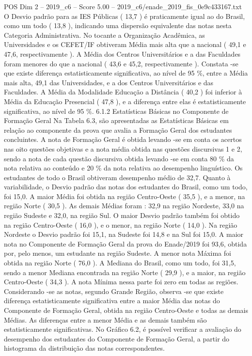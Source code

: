 \begin{textsample}{POS Dim 2 – 2019\_c6 – Score 5.00 – 2019\_c6/enade\_2019\_fis\_0e9c433167.txt}
O Desvio padrão para as IES Públicas ( 13,7 ) é praticamente igual ao do Brasil, como um todo ( 13,8 ), indicando uma dispersão equivalente das notas nesta Categoria Administrativa.
No tocante a Organização Acadêmica, as Universidades e os CEFET/IF obtiveram Média mais alta que a nacional ( 49,1 e 47,6, respectivamente ).
A Média dos Centros Universitários e a das Faculdades foram menores do que a nacional ( 43,6 e 45,2, respectivamente ).
Constata -se que existe diferença estatisticamente significativa, ao nível de 95 \%, entre a Média mais alta, 49,1 das Universidades, e a dos Centros Universitários e das Faculdades.
A Média da Modalidade Educação a Distância ( 40,2 ) foi inferior à Média da Educação Presencial ( 47,8 ), e a diferença entre elas é estatisticamente significativa, ao nível de 95 \%. 6.1.2 Estatísticas Básicas no Componente de Formação Geral Na Tabela 6.3, são apresentadas as Estatísticas Básicas em relação ao componente da prova que avalia a Formação Geral dos estudantes concluintes.
A nota de Formação Geral é obtida levando -se em conta os acertos nas oito questões objetivas e a nota média obtida nas questões discursivas 1 e 2, sendo a nota de cada questão discursiva obtida levando -se em conta 80 \% da nota relativa ao conteúdo e 20 \% da nota relativa ao desempenho linguístico.
Os estudantes de todo o Brasil obtiveram desempenho médio de 32,7.
Quanto à variabilidade, o Desvio padrão das notas dos estudantes do Brasil, como um todo, foi 15,0.
A maior Média foi obtida na região Centro-Oeste ( 35,5 ), e a menor, na região Norte ( 30,5 ).
As demais Médias foram : 32,9 na região Nordeste, 33,0 na região Sudeste e 32,0, na região Sul.
O maior Desvio padrão também foi obtido na região Centro-Oeste ( 16,0 ), e o menor, na região Norte ( 14,0 ).
Na região Nordeste o Desvio padrão foi 15,1, na Sudeste foi 14,8 e na Sul foi 15,0.
A maior nota no Componente de Formação Geral da prova do Enade/2019 foi 93,6, obtida por, pelo menos, um estudante na região Sudeste.
A menor nota Máxima foi obtida na região Norte ( 76,0 ).
A Mediana do Brasil, como um todo, foi 31,5, sendo a menor Mediana encontrada na região Norte ( 29,9 ), e a maior, na região Centro-Oeste ( 34,3 ).
A nota Mínima nessa parte foi zero em todas as regiões.
Considerando -se as notas, segundo Grande Região, observa -se que existe diferença estatisticamente significativa entre a maior Média das notas do Componente de Formação Geral, obtida na região Centro-Oeste e todas as demais Médias.
As diferenças entre a menor Média e as demais também são estatisticamente significativas.
No Gráfico 6.2, é possível verificar a avaliação do desempenho dos estudantes do Componente de Formação Geral, a partir do histograma da distribuição das notas correspondentes.

\end{textsample}
